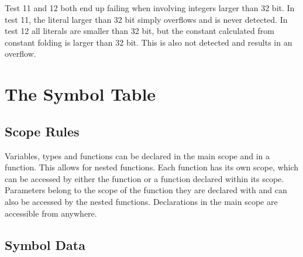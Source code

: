 \documentclass{article}
\begin{document}
Test 11 and 12 both end up failing when involving integers larger than 32 bit. In test 11, the literal larger than 32 bit simply overflows and is never detected. In test 12 all literals are smaller than 32 bit, but the constant calculated from constant folding is larger than 32 bit. This is also not detected and results in an overflow. 

\section{The Symbol Table}

\subsection{Scope Rules}

Variables, types and functions can be declared in the main scope and in a function. This allows for nested functions. Each function has its own scope, which can be accessed by either the function or a function declared within its scope. Parameters belong to the scope of the function they are declared with and can also be accessed by the nested functions. Declarations in the main scope are accessible from anywhere. 



\subsection{Symbol Data}


\end{document}

